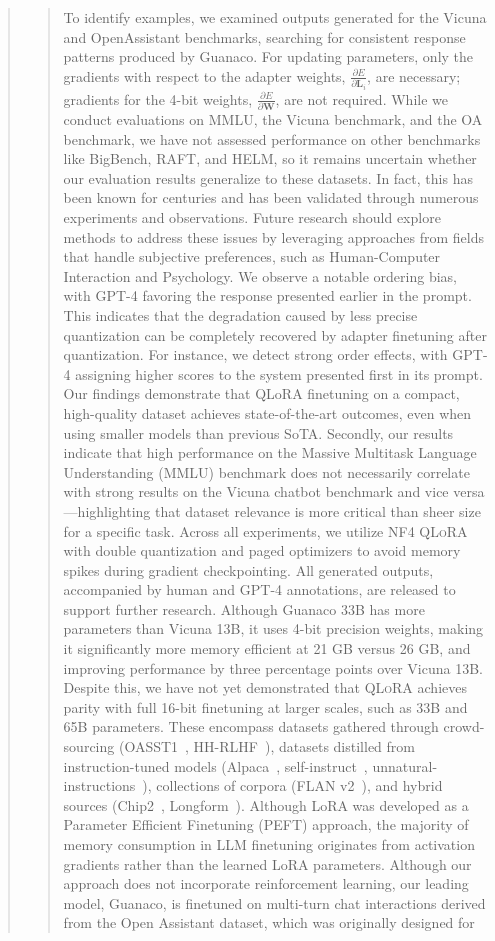 \begin{quote}
\begin{quote}
To identify examples, we examined outputs generated for the Vicuna and OpenAssistant benchmarks, searching for consistent response patterns produced by {Guanaco}. For updating parameters, only the gradients with respect to the adapter weights, $\frac{\partial E}{\partial \mathbf{L}_i}$, are necessary; gradients for the 4-bit weights, $\frac{\partial E}{\partial \mathbf{W}}$, are not required. While we conduct evaluations on MMLU, the Vicuna benchmark, and the OA benchmark, we have not assessed performance on other benchmarks like BigBench, RAFT, and HELM, so it remains uncertain whether our evaluation results generalize to these datasets. In fact, this has been known for centuries and has been validated through numerous experiments and observations. Future research should explore methods to address these issues by leveraging approaches from fields that handle subjective preferences, such as Human-Computer Interaction and Psychology. We observe a notable ordering bias, with GPT-4 favoring the response presented earlier in the prompt. This indicates that the degradation caused by less precise quantization can be completely recovered by adapter finetuning after quantization. For instance, we detect strong order effects, with GPT-4 assigning higher scores to the system presented first in its prompt. Our findings demonstrate that QLoRA finetuning on a compact, high-quality dataset achieves state-of-the-art outcomes, even when using smaller models than previous SoTA. Secondly, our results indicate that high performance on the Massive Multitask Language Understanding (MMLU) benchmark does not necessarily correlate with strong results on the Vicuna chatbot benchmark and vice versa—highlighting that dataset relevance is more critical than sheer size for a specific task. Across all experiments, we utilize NF4 \textsc{QLoRA} with double quantization and paged optimizers to avoid memory spikes during gradient checkpointing. All generated outputs, accompanied by human and GPT-4 annotations, are released to support further research. Although {Guanaco} 33B has more parameters than Vicuna 13B, it uses 4-bit precision weights, making it significantly more memory efficient at 21 GB versus 26 GB, and improving performance by three percentage points over Vicuna 13B. Despite this, we have not yet demonstrated that \textsc{QLoRA} achieves parity with full 16-bit finetuning at larger scales, such as 33B and 65B parameters. These encompass datasets gathered through crowd-sourcing (OASST1~\citep{kopf2023openassistant}, HH-RLHF~\citep{bai2022training}), datasets distilled from instruction-tuned models (Alpaca~\citep{alpaca}, self-instruct~\citep{wang2022self}, unnatural-instructions~\citep{honovich2022unnatural}), collections of corpora (FLAN v2~\citep{chung2022scaling}), and hybrid sources (Chip2~\citep{laion2023}, Longform~\citep{koksal2023longform}). Although LoRA was developed as a Parameter Efficient Finetuning (PEFT) approach, the majority of memory consumption in LLM finetuning originates from activation gradients rather than the learned LoRA parameters. Although our approach does not incorporate reinforcement learning, our leading model, Guanaco, is finetuned on multi-turn chat interactions derived from the Open Assistant dataset, which was originally designed for 
\end{quote}
\end{quote}
